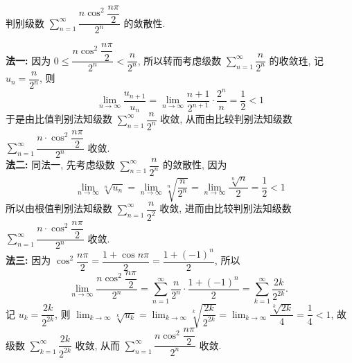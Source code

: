 \begin{example}
    判别级数 $\displaystyle \sum_{n=1}^{\infty} \dfrac{n \cos ^2 \dfrac{n \pi}{2}}{2^n}$ 的敛散性.
\end{example}
\begin{solution}
    \textbf{法一: }因为 $0 \leqslant \dfrac{n \cos ^2 \dfrac{n \pi}{2}}{2^n}<\dfrac{n}{2^n}$, 所以转而考虑级数 $\displaystyle \sum_{n=1}^{\infty} \dfrac{n}{2^n}$ 的收敛珄, 记 $u_n=\dfrac{n}{2^n}$, 则
    $$\lim _{n \to \infty} \dfrac{u_{n+1}}{u_n}=\lim _{n \to \infty} \dfrac{n+1}{2^{n+1}} \cdot \dfrac{2^n}{n}=\dfrac{1}{2}<1$$
    于是由比值判别法知级数 $\displaystyle \sum_{n=1}^{\infty} \dfrac{n}{2^n}$ 收敛, 从而由比较判别法知级数 $\displaystyle \sum_{n=1}^{\infty} \dfrac{n \cdot \cos ^2 \dfrac{n \pi}{2}}{2^n}$ 收敛.\\
    \textbf{法二: }同法一, 先考虑级数 $\displaystyle \sum_{n=1}^{\infty} \dfrac{n}{2^n}$ 的敛散性, 因为
    $$\lim _{n \to \infty} \sqrt[n]{u_n}=\lim _{n \to \infty} \sqrt[n]{\dfrac{n}{2^n}}=\lim _{n \to \infty} \dfrac{\sqrt[n]{n}}{2}=\dfrac{1}{2}<1$$
    所以由根值判别法知级数 $\displaystyle \sum_{n=1}^{\infty} \dfrac{n}{2^2}$ 收敛, 进而由比较判别法知级数 $\displaystyle \sum_{n=1}^{\infty} \dfrac{n \cdot \cos ^2 \dfrac{n \pi}{2}}{2^n}$ 收敛.\\
    \textbf{法三: }因为 $\cos ^2 \dfrac{n \pi}{2}=\dfrac{1+\cos n \pi}{2}=\dfrac{1+(-1)^n}{2}$, 所以
    $$
        \lim _{n \to \infty} \dfrac{n \cos ^2 \dfrac{n \pi}{2}}{2^n}=\sum_{n=1}^{\infty} \dfrac{n}{2^n} \cdot \dfrac{1+(-1)^n}{2}=\sum_{k=1}^{\infty} \dfrac{2 k}{2^{2 k}} \text {. }
    $$
    记 $u_k=\dfrac{2 k}{2^{2 k}}$, 则 $\displaystyle \lim _{k \to \infty} \sqrt[k]{u_k}=\lim _{k \to \infty} \sqrt[k]{\dfrac{2 k}{2^{2 k}}}=\lim _{k \to \infty} \dfrac{\sqrt[k]{2 k}}{4}=\dfrac{1}{4}<1$, 故级数 $\displaystyle \sum_{k=1}^{\infty} \dfrac{2 k}{2^{2 k}}$ 收敛, 从而 $\displaystyle \sum_{n=1}^\infty \dfrac{n\cos^2\dfrac{n\pi}{2}}{2^n}$ 收敛.
\end{solution}


